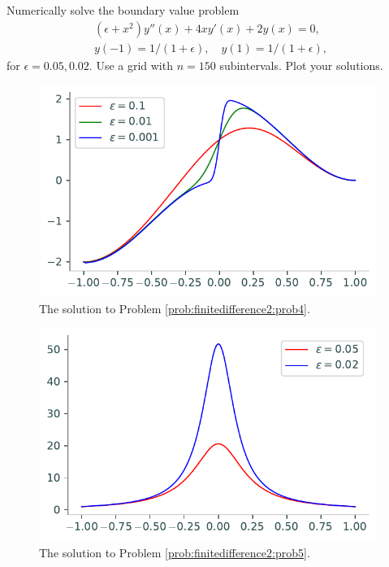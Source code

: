 \begin{problem}
Numerically solve the boundary value problem
\begin{align*}
	(\epsilon +x^2)y''(x) + 4xy'(x) + 2y(x) = 0, \\
	y(-1) = 1/(1+\epsilon), \quad y(1) = 1/(1+\epsilon),
\end{align*}
for $\epsilon = 0.05, 0.02$.
Use a grid with $n=150$ subintervals.
Plot your solutions.
\label{prob:finitedifference2:prob5}
\end{problem}

\begin{figure}[h]
\centering
\includegraphics[width=11cm]{figures/figure4.pdf}
\caption{The solution to Problem \ref{prob:finitedifference2:prob4}.
}
\end{figure}

\begin{figure}
\centering
\includegraphics[width=11cm]{figures/figure5.pdf}
\caption{The solution to Problem \ref{prob:finitedifference2:prob5}.
}
\end{figure}
